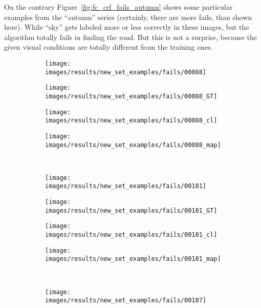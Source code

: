 On the contrary Figure~\ref{fig:fc_crf_fails_autumn} shows some particular examples from the ``autumn'' series (certainly, there are more fails, than
shown here). While ``sky'' gets labeled more or less correctly in these images, but the algorithm totally fails in finding the road. But this is not
a surprise, because the given visual conditions are totally different from the training ones.

\begin{figure}[t]
 \centering
 \begin{subfigure}[c]{0.24\textwidth}
  \centering
  \texttt{[image: images/results/new\_set\_examples/fails/00088]}
 \end{subfigure}
 \begin{subfigure}[c]{0.24\textwidth}
  \centering
  \texttt{[image: images/results/new\_set\_examples/fails/00088\_GT]}
 \end{subfigure}
 \begin{subfigure}[c]{0.24\textwidth}
  \centering
  \texttt{[image: images/results/new\_set\_examples/fails/00088\_cl]}
 \end{subfigure}
 \begin{subfigure}[c]{0.24\textwidth}
  \centering
  \texttt{[image: images/results/new\_set\_examples/fails/00088\_map]}
 \end{subfigure}
 \\
 \begin{subfigure}[c]{0.24\textwidth}
  \centering
  \texttt{[image: images/results/new\_set\_examples/fails/00101]}
 \end{subfigure}
 \begin{subfigure}[c]{0.24\textwidth}
  \centering
  \texttt{[image: images/results/new\_set\_examples/fails/00101\_GT]}
 \end{subfigure}
 \begin{subfigure}[c]{0.24\textwidth}
  \centering
  \texttt{[image: images/results/new\_set\_examples/fails/00101\_cl]}
 \end{subfigure}
 \begin{subfigure}[c]{0.24\textwidth}
  \centering
  \texttt{[image: images/results/new\_set\_examples/fails/00101\_map]}
 \end{subfigure}
 \\
 \begin{subfigure}[c]{0.24\textwidth}
  \centering
  \texttt{[image: images/results/new\_set\_examples/fails/00107]}

\end{subfigure}
\end{figure}
